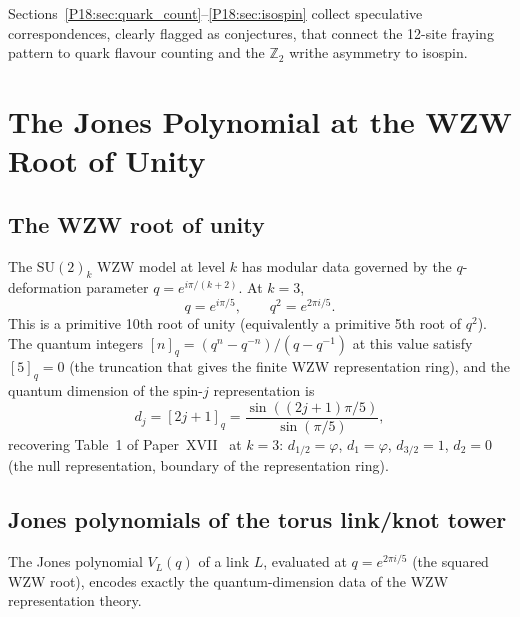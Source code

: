 \documentclass[11pt,a4paper]{article}
\theoremstyle{definition}\newtheorem{definition}[theorem]{Definition}
\theoremstyle{remark}
\newcommand{\vp}{\varphi}
\newcommand{\SU}{\mathrm{SU}}
\newcommand{\Ztwo}{\mathbb{Z}_2}
\newcommand{\dimq}[1]{d_{#1}}
\newcommand{\Jones}{V}
\begin{document}
Sections~\ref{P18:sec:quark_count}--\ref{P18:sec:isospin} collect speculative
correspondences, clearly flagged as conjectures, that connect the
12-site fraying pattern to quark flavour counting and the $\Ztwo$
writhe asymmetry to isospin.

\section{The Jones Polynomial at the WZW Root of Unity}
\label{P18:sec:jones}

\subsection{The WZW root of unity}
\label{P18:sec:root_of_unity}

The $\SU(2)_k$ WZW model at level $k$ has modular data governed by
the $q$-deformation parameter $q = e^{i\pi/(k+2)}$.  At $k=3$,
\begin{equation}
  q = e^{i\pi/5}, \qquad q^2 = e^{2\pi i/5}.
  \label{P18:eq:q_wzw}
\end{equation}
This is a primitive 10th root of unity (equivalently a primitive
5th root of $q^2$).  The quantum integers $[n]_q =
(q^n-q^{-n})/(q-q^{-1})$ at this value satisfy $[5]_q = 0$
(the truncation that gives the finite WZW representation ring),
and the quantum dimension of the spin-$j$ representation is
\begin{equation}
  \dimq{j} = [2j+1]_q = \frac{\sin((2j+1)\pi/5)}{\sin(\pi/5)},
  \label{P18:eq:dimq}
\end{equation}
recovering Table~1 of Paper~XVII~\cite{Paper17} at $k=3$:
$\dimq{1/2} = \vp$, $\dimq{1} = \vp$, $\dimq{3/2} = 1$,
$\dimq{2} = 0$ (the null representation, boundary of the representation
ring).

\subsection{Jones polynomials of the torus link/knot tower}

The Jones polynomial $\Jones_L(q)$ of a link $L$, evaluated at
$q = e^{2\pi i/5}$ (the squared WZW root), encodes exactly the
quantum-dimension data of the WZW representation theory.
\end{document}
